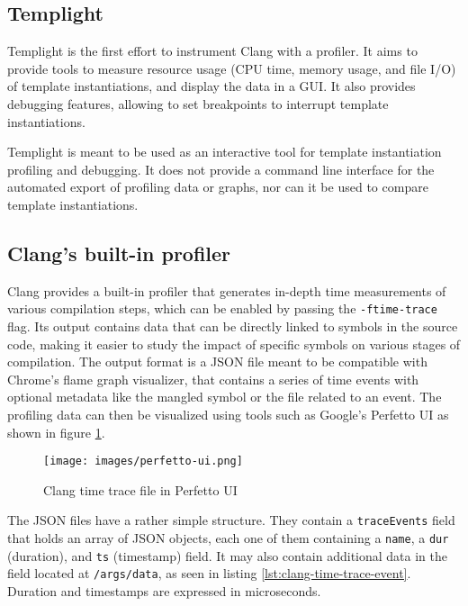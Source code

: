 \documentclass[../main]{subfiles}
\begin{document}
\subsection{
  Templight
}

Templight \cite{templight} is the first effort to instrument Clang with a
profiler. It aims to provide tools to measure resource usage (CPU time,
memory usage, and file I/O) of template instantiations, and display the
data in a GUI. It also provides debugging features, allowing to set breakpoints
to interrupt template instantiations.

Templight is meant to be used as an interactive tool for template instantiation
profiling and debugging. It does not provide a command line interface for the
automated export of profiling data or graphs, nor can it be used to compare
template instantiations.

\subsection{
  Clang's built-in profiler
}

Clang provides a built-in profiler \cite{time-trace} that generates
in-depth time measurements of various compilation steps, which can be enabled by
passing the \lstinline{-ftime-trace} flag. Its output contains data that can be
directly linked to symbols in the source code, making it easier to study the
impact of specific symbols on various stages of compilation. The output format
is a JSON file meant to be compatible with Chrome's flame graph visualizer, that
contains a series of time events with optional metadata like the mangled \cpp
symbol or the file related to an event. The profiling data can then be
visualized using tools such as Google's Perfetto UI as shown in figure
\ref{fig:perfetto-time-trace-ui}.

\begin{figure}[h]
\texttt{[image: images/perfetto-ui.png]}
\caption{Clang time trace file in Perfetto UI}
\label{fig:perfetto-time-trace-ui}
\clearpage
\end{figure}

The JSON files have a rather simple structure. They contain a
\lstinline{traceEvents} field that holds an array of JSON objects, each one of
them containing a \lstinline{name}, a \lstinline{dur} (duration), and
\lstinline{ts} (timestamp) field. It may also contain additional data in the
field located at \lstinline{/args/data}, as seen in listing
\ref{lst:clang-time-trace-event}. Duration and timestamps are expressed in
microseconds.
\end{document}
